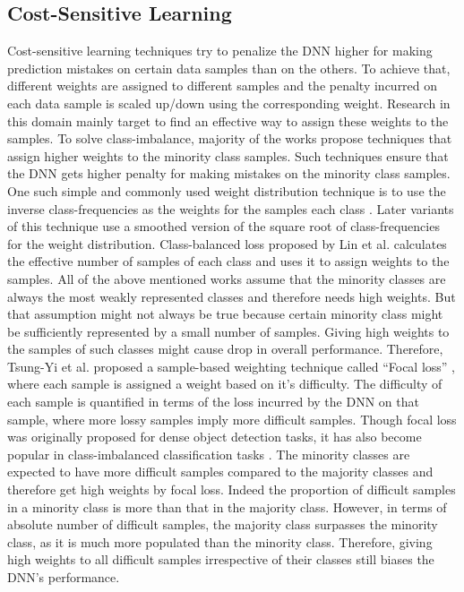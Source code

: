 \documentclass[runningheads]{llncs}
\begin{document}
\subsection{Cost-Sensitive Learning}

Cost-sensitive learning techniques try to penalize the DNN higher for making
prediction mistakes on certain data samples than on the others. To achieve 
that, different weights are assigned to different samples and the penalty 
incurred on each
data sample is scaled up/down using the corresponding weight. Research in this 
domain mainly target to find an effective way to assign these weights to the 
samples. To
solve class-imbalance, majority of the works propose techniques that assign 
higher
weights to the minority class samples. Such techniques ensure that the DNN gets
higher penalty for making mistakes on the minority class samples. One such 
simple and commonly used weight distribution technique is to use the inverse 
class-frequencies as the weights for the samples each class 
\cite{Inverse_freq1,Inverse_freq2}. Later 
variants of this
technique \cite{Smoothed_inv} use a smoothed version of the square root of class-frequencies 
for the
weight distribution. Class-balanced loss \cite{Class_balancedloss} proposed by Lin et al. calculates 
the effective number of samples of each class and uses it to assign weights to 
the samples.
All of the above mentioned works assume that the minority classes are always the
most weakly represented classes and therefore needs high weights. But that 
assumption might not always be true because certain minority class might be 
sufficiently
represented by a small number of samples. Giving high weights to the samples of
such classes might cause drop in overall performance. Therefore, Tsung-Yi et al. 
proposed a sample-based weighting technique called “Focal loss” \cite{FOCALloss}, where each 
sample is assigned a weight based on it’s difficulty. The difficulty of each 
sample is quantified in terms of the loss incurred by the DNN on that sample, 
where more lossy samples imply more difficult samples. Though focal loss \cite{FOCALloss}
was originally proposed for
dense object detection tasks, it has also become popular in class-imbalanced 
classification tasks \cite{Class_balancedloss}. The minority classes are expected to have more difficult 
samples compared to the majority classes and therefore get high weights by focal 
loss. Indeed the proportion of difficult samples in a minority class is more 
than that in the majority
class. However, in terms of absolute number of difficult samples, the majority 
class
surpasses the minority class, as it is much more populated than the minority 
class.
Therefore, giving high weights to all difficult samples irrespective of their 
classes still
biases the DNN’s performance.
\end{document}
